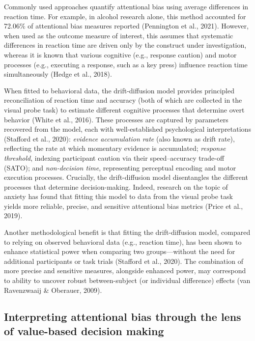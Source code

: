 \documentclass[authordate, empirical]{jote-new-article}
\begin{document}
	Commonly used approaches quantify attentional bias using average differences in reaction time. For example, in alcohol research alone, this method accounted for 72.06\% of attentional bias measures reported (Pennington et al., 2021). However, when used as the outcome measure of interest, this assumes that systematic differences in reaction time are driven only by the construct under investigation, whereas it is known that various cognitive (e.g., response caution) and motor processes (e.g., executing a response, such as a key press) influence reaction time simultaneously (Hedge et al., 2018).



	When fitted to behavioral data, the drift-diffusion model provides principled reconciliation of reaction time and accuracy (both of which are collected in the visual probe task) to estimate different cognitive processes that determine overt behavior (White et al., 2016). These processes are captured by parameters recovered from the model, each with well-established psychological interpretations (Stafford et al., 2020): \emph{evidence accumulation rate} (also known as drift rate), reflecting the rate at which momentary evidence is accumulated; \emph{response threshold}, indexing participant caution via their speed--accuracy trade-off (SATO); and \emph{non-decision time}, representing perceptual encoding and motor execution processes. Crucially, the drift-diffusion model disentangles the different processes that determine decision-making. Indeed, research on the topic of anxiety has found that fitting this model to data from the visual probe task yields more reliable, precise, and sensitive attentional bias metrics (Price et al., 2019).



	Another methodological benefit is that fitting the drift-diffusion model, compared to relying on observed behavioral data (e.g., reaction time), has been shown to enhance statistical power when comparing two groups—without the need for additional participants or task trials (Stafford et al., 2020). The combination of more precise and sensitive measures, alongside enhanced power, may correspond to ability to uncover robust between-subject (or individual difference) effects (van Ravenzwaaij \& Oberauer, 2009).



	\subsection{Interpreting attentional bias through the lens of value-based decision making}
\end{document}
